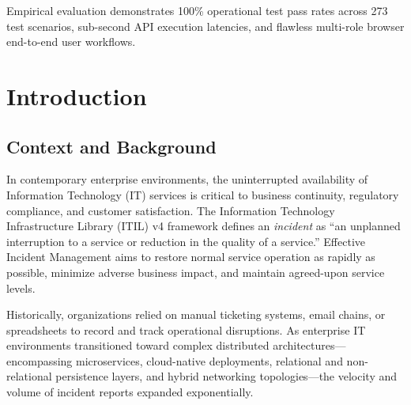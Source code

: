 \documentclass[11pt,a4paper,oneside]{report}
\begin{document}
Empirical evaluation demonstrates 100\% operational test pass rates across 273 test scenarios, sub-second API execution latencies, and flawless multi-role browser end-to-end user workflows.

\cleardoublepage
\tableofcontents

\cleardoublepage
\listoffigures

\cleardoublepage
\listoftables

\cleardoublepage


\chapter{Introduction}
\label{ch:introduction}

\section{Context and Background}
\label{sec:intro_context}
In contemporary enterprise environments, the uninterrupted availability of Information Technology (IT) services is critical to business continuity, regulatory compliance, and customer satisfaction. The Information Technology Infrastructure Library (ITIL) v4 framework defines an \textit{incident} as ``an unplanned interruption to a service or reduction in the quality of a service.'' Effective Incident Management aims to restore normal service operation as rapidly as possible, minimize adverse business impact, and maintain agreed-upon service levels.

Historically, organizations relied on manual ticketing systems, email chains, or spreadsheets to record and track operational disruptions. As enterprise IT environments transitioned toward complex distributed architectures---encompassing microservices, cloud-native deployments, relational and non-relational persistence layers, and hybrid networking topologies---the velocity and volume of incident reports expanded exponentially. 
\end{document}
